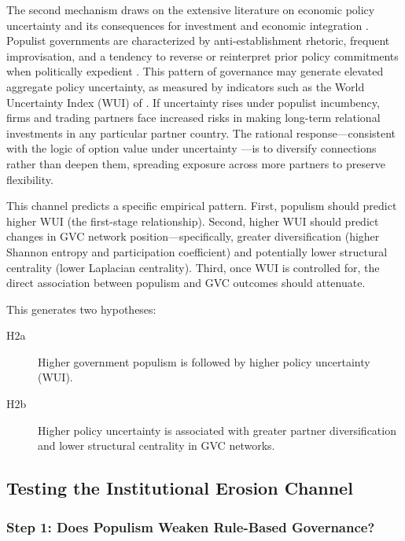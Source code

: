 \documentclass[12pt]{article}
\begin{document}
The second mechanism draws on the extensive literature on economic policy uncertainty and its consequences for investment and economic integration \citep{baker2016, bloom2009, handley2015, julio2012}. Populist governments are characterized by anti-establishment rhetoric, frequent improvisation, and a tendency to reverse or reinterpret prior policy commitments when politically expedient \citep{funke2020, guriev2022, dornbusch1991}. This pattern of governance may generate elevated aggregate policy uncertainty, as measured by indicators such as the World Uncertainty Index (WUI) of \citet{ahir2022}. If uncertainty rises under populist incumbency, firms and trading partners face increased risks in making long-term relational investments in any particular partner country. The rational response---consistent with the logic of option value under uncertainty \citep{bloom2009}---is to diversify connections rather than deepen them, spreading exposure across more partners to preserve flexibility.

This channel predicts a specific empirical pattern. First, populism should predict higher WUI (the first-stage relationship). Second, higher WUI should predict changes in GVC network position---specifically, greater diversification (higher Shannon entropy and participation coefficient) and potentially lower structural centrality (lower Laplacian centrality). Third, once WUI is controlled for, the direct association between populism and GVC outcomes should attenuate.

This generates two hypotheses:

\begin{description}
  \item[H2a] Higher government populism is followed by higher policy uncertainty (WUI).
  \item[H2b] Higher policy uncertainty is associated with greater partner diversification and lower structural centrality in GVC networks.
\end{description}

\subsection{Testing the Institutional Erosion Channel}

\subsubsection*{Step 1: Does Populism Weaken Rule-Based Governance?}
\end{document}
